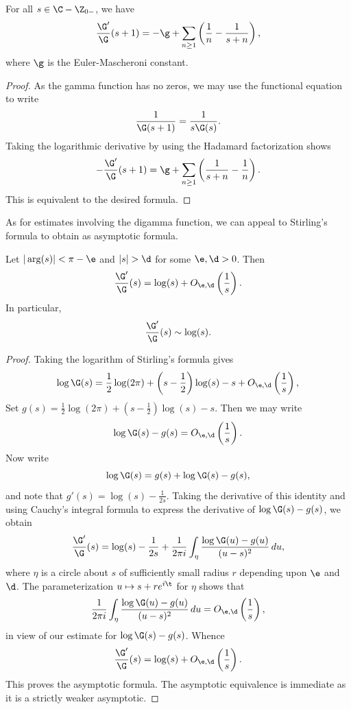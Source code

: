 \documentclass[12pt]{article}
\begin{document}
    \begin{corollary}\label{cor:logarithmic_derivative_of_gamma}
      For all \(s \in \C-\Z_{0-}\), we have
      \[
        \frac{\G'}{\G}(s+1) = -\g+\sum_{n \ge 1}\left(\frac{1}{n}-\frac{1}{s+n}\right),
      \]
      where \(\g\) is the Euler-Mascheroni constant.
    \end{corollary}
    \begin{proof}
      As the gamma function has no zeros, we may use the functional equation to write
      \[
        \frac{1}{\G(s+1)} = \frac{1}{s\G(s)}.
      \]
      Taking the logarithmic derivative by using the Hadamard factorization shows
      \[
        -\frac{\G'}{\G}(s+1) = \g+\sum_{n \ge 1}\left(\frac{1}{s+n}-\frac{1}{n}\right).
      \]
      This is equivalent to the desired formula.
    \end{proof}
    
    As for estimates involving the digamma function, we can appeal to Stirling's formula to obtain as asymptotic formula.

    \begin{proposition}\label{equ:approximtion_for_digamma}
      Let \(|\arg(s)| < \pi-\e\) and \(|s| > \d\) for some \(\e,\d > 0\). Then
      \[
        \frac{\G'}{\G}(s) = \log(s)+O_{\e,\d}\left(\frac{1}{s}\right).
      \]
      In particular,
      \[
        \frac{\G'}{\G}(s) \sim \log(s).
      \]
    \end{proposition}
    \begin{proof}
      Taking the logarithm of Stirling's formula gives
      \[
        \log\G(s) = \frac{1}{2}\log(2\pi)+\left(s-\frac{1}{2}\right)\log(s)-s+O_{\e,\d}\left(\frac{1}{s}\right),
      \]
      Set \(g(s) = \frac{1}{2}\log(2\pi)+\left(s-\frac{1}{2}\right)\log(s)-s\). Then we may write
      \[
        \log\G(s)-g(s) = O_{\e,\d}\left(\frac{1}{s}\right).
      \]
      Now write
      \[
        \log\G(s) = g(s)+\log\G(s)-g(s),
      \]
      and note that \(g'(s) = \log(s)-\frac{1}{2s}\). Taking the derivative of this identity and using Cauchy's integral formula to express the derivative of \(\log\G(s)-g(s)\), we obtain
      \[
        \frac{\G'}{\G}(s) = \log(s)-\frac{1}{2s}+\frac{1}{2\pi i}\int_{\eta}\frac{\log\G(u)-g(u)}{(u-s)^{2}}\,du,
      \]
      where \(\eta\) is a circle about \(s\) of sufficiently small radius \(r\) depending upon \(\e\) and \(\d\). The parameterization \(u \mapsto s+re^{i\t}\) for \(\eta\) shows that
      \[
        \frac{1}{2\pi i}\int_{\eta}\frac{\log\G(u)-g(u)}{(u-s)^{2}}\,du = O_{\e,\d}\left(\frac{1}{s}\right),
      \]
      in view of our estimate for \(\log\G(s)-g(s)\). Whence
      \[
        \frac{\G'}{\G}(s) = \log(s)+O_{\e,\d}\left(\frac{1}{s}\right).
      \]
      This proves the asymptotic formula. The asymptotic equivalence is immediate as it is a strictly weaker asymptotic.
    \end{proof}
\end{document}
